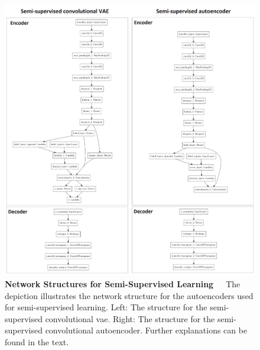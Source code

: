 \begin{figure}[!htb]
	\centering
	\includegraphics[scale=0.8]{Figures/chapter04/semi_supervised_network.png}
	\decoRule
	\caption[Semi-Supervised Learning Network Structures]{\textbf{Network Structures for Semi-Supervised Learning}~~~The depiction illustrates the network structure for the autoencoders used for semi-supervised learning. Left: The structure for the semi-supervised convolutional \acrshort{vae}. Right: The structure for the semi-supervised convolutional autoencoder. Further explanations can be found in the text.}
	\label{fig:SemiSupervisedNetworkStructures}
\end{figure}

